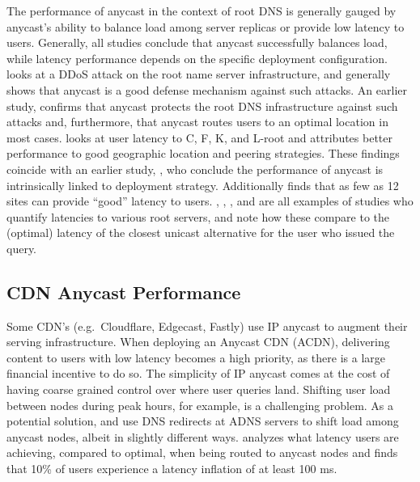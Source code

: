 \documentclass[sigconf,nonacm,10pt]{acmart}
\begin{document}
The performance of anycast in the context of root DNS is generally
gauged by anycast's ability to balance load among server replicas or
provide low latency to users. Generally, all studies conclude that
anycast successfully balances load, while latency performance depends on
the specific deployment configuration. \cite{moura2016anycast} looks at
a DDoS attack on the root name server infrastructure, and generally
shows that anycast is a good defense mechanism against such attacks. An
earlier study, \cite{sarat2006use} confirms that anycast protects the
root DNS infrastructure against such attacks and, furthermore, that
anycast routes users to an optimal location in most cases.
\cite{de2017anycast} looks at user latency to C, F, K, and L-root and
attributes better performance to good geographic location and peering
strategies. These findings coincide with an earlier study,
\cite{ballani2006measurement}, who conclude the performance of anycast
is intrinsically linked to deployment strategy. Additionally
\cite{de2017anycast} finds that as few as 12 sites can provide ``good''
latency to users. \cite{li_levin_spring_bhattacharjee_2018},
\cite{colitti2006evaluating}, \cite{de2017anycast}, and
\cite{liang2013measuring} are all examples of studies who quantify
latencies to various root servers, and note how these compare to the
(optimal) latency of the closest unicast alternative for the user who
issued the query.

\subsection{CDN Anycast Performance}\label{cdn-anycast-performance}

Some CDN's (e.g.~Cloudflare, Edgecast, Fastly) use IP anycast to augment
their serving infrastructure. When deploying an Anycast CDN (ACDN),
delivering content to users with low latency becomes a high priority, as
there is a large financial incentive to do so. The simplicity of IP
anycast comes at the cost of having coarse grained control over where
user queries land. Shifting user load between nodes during peak hours,
for example, is a challenging problem. As a potential solution,
\cite{flavel2015fastroute} and \cite{alzoubi2011practical} use DNS
redirects at ADNS servers to shift load among anycast nodes, albeit in
slightly different ways. \cite{calder2015analyzing} analyzes what
latency users are achieving, compared to optimal, when being routed to
anycast nodes and finds that 10\% of users experience a latency
inflation of at least 100 ms.
\end{document}
